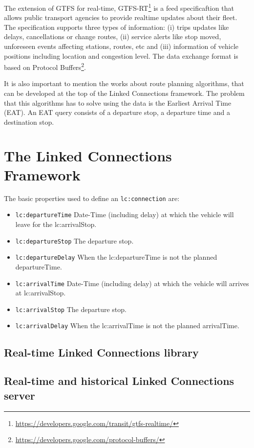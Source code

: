 \documentclass[sw]{iosart2x}
\begin{document}
The extension of GTFS for real-time, GTFS-RT\footnote{\url{https://developers.google.com/transit/gtfs-realtime/}} is a feed specificaftion that allows public transport agencies to provide realtime updates about their fleet. The specification supports three types of information: (i) trips updates like delays, cancellations or change routes, (ii) service alerts like stop moved, unforeseen events affecting stations, routes, etc and (iii)  information of vehicle positions  including location and congestion level. The data exchange format is based on Protocol Buffers\footnote{\url{https://developers.google.com/protocol-buffers/}}.

It is also important to mention the works about route planning algorithms, that can be developed at the top of the Linked Connections framework. The problem that this algorithms has to solve using the data is the Earliest Arrival Time (EAT). An EAT query consists of a departure stop, a departure time and a destination stop. 



\section{The Linked Connections Framework}


The basic properties used to define an \texttt{lc:connection} are:
\begin{itemize}
	\item \texttt{lc:departureTime} Date-Time (including delay) at which the vehicle will leave for the lc:arrivalStop.
	\item \texttt{lc:departureStop} The departure stop.
	\item \texttt{lc:departureDelay} When the lc:departureTime is not the planned departureTime.
	\item \texttt{lc:arrivalTime} Date-Time (including delay) at which the vehicle will arrives at lc:arrivalStop.
	\item \texttt{lc:arrivalStop} The departure stop.
	\item \texttt{lc:arrivalDelay} When the lc:arrivalTime is not the planned arrivalTime.
\end{itemize}

\subsection{Real-time Linked Connections library}

\subsection{Real-time and historical Linked Connections server}
\end{document}

